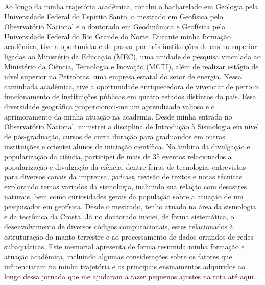 \documentclass[10pt,a4paper,oneside]{book}
\begin{document}
Ao longo da minha trajetória acadêmica, conclui o bacharelado em \href{https://geologia.ufes.br/}{Geologia} pela Universidade Federal do Espírito Santo, o mestrado em \href{https://www.gov.br/observatorio/pt-br/assuntos/programas-academicos/pos-graduacao-em-geofisica/pos-graduacao-em-geofisica}{Geofísica} pelo Observatório Nacional e o doutorado em \href{https://posgraduacao.ufrn.br/325}{Geodinâmica e Geofísica} pela Universidade Federal do Rio Grande do Norte. Durante minha formação acadêmica, tive a oportunidade de passar por três instituições de ensino superior ligadas ao Ministério da Educação (MEC), uma unidade de pesquisa vinculada ao Ministério da Ciência, Tecnologia e Inovação (MCTI), além de realizar estágio de nível superior na Petrobras, uma empresa estatal do setor de energia. Nessa caminhada acadêmica, tive a oportunidade enriquecedora de vivenciar de perto o funcionamento de instituições públicas em quatro estados distintos do país. Essa diversidade geográfica proporcionou-me um aprendizado valioso e o aprimoramento da minha atuação na academia. Desde minha entrada no Observatório Nacional, ministrei a disciplina de \href{https://www.gov.br/observatorio/pt-br/assuntos/programas-academicos/pos-graduacao-em-geofisica/grade-curricular}{Introdução à Sismologia} em nível de pós-graduação, cursos de curta duração para graduandos em outras instituições e orientei alunos de iniciação científica. No âmbito da divulgação e popularização da ciência, participei de mais de 35 eventos relacionados a popularização e divulgação da ciência, dentre feiras de tecnologia, entrevistas para diversos canais da imprensa, \textit{podcast}, revisão de textos e notas técnicas explorando temas variados da sismologia, incluindo sua relação com desastres naturais, bem como curiosidades gerais da população sobre a atuação de um pesquisador em geofísica. Desde o mestrado, tenho atuado na área da sismologia e da tectônica da Crosta. Já no doutorado iniciei, de forma sistemática, o desenvolvimento de diversos códigos computacionais, estes relacionados à estruturação do manto terrestre e ao processamento de dados oriundos de redes subaquáticas. Este memorial apresenta de forma resumida minha formação e atuação acadêmica, incluindo algumas considerações sobre os fatores que influenciaram na minha trajetória e os principais ensinamentos adquiridos ao longo dessa jornada que me ajudaram a fazer pequenos ajustes na rota até aqui.
\end{document}
